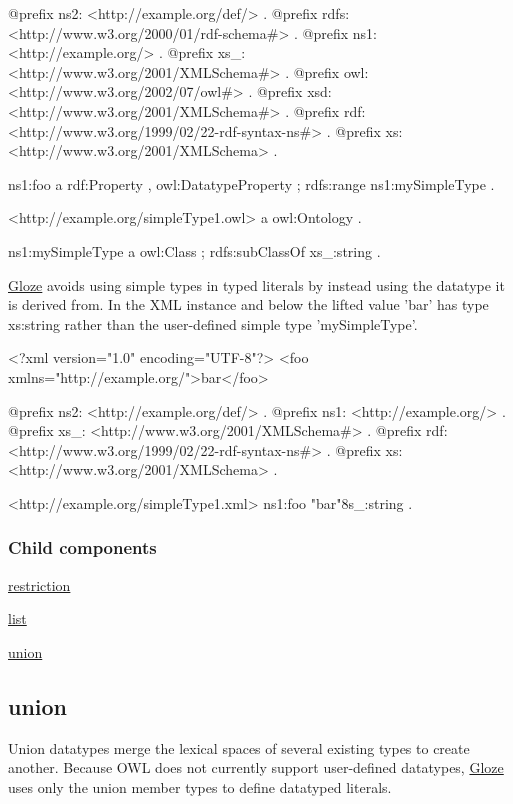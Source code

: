 \begin{DoxyCodeInclude}
@prefix ns2:     <http://example.org/def/> .
@prefix rdfs:    <http://www.w3.org/2000/01/rdf-schema#> .
@prefix ns1:     <http://example.org/> .
@prefix xs_:     <http://www.w3.org/2001/XMLSchema#> .
@prefix owl:     <http://www.w3.org/2002/07/owl#> .
@prefix xsd:     <http://www.w3.org/2001/XMLSchema#> .
@prefix rdf:     <http://www.w3.org/1999/02/22-rdf-syntax-ns#> .
@prefix xs:      <http://www.w3.org/2001/XMLSchema> .

ns1:foo
      a       rdf:Property , owl:DatatypeProperty ;
      rdfs:range ns1:mySimpleType .

<http://example.org/simpleType1.owl>
      a       owl:Ontology .

ns1:mySimpleType
      a       owl:Class ;
      rdfs:subClassOf xs_:string .
\end{DoxyCodeInclude}


\hyperlink{classcom_1_1hp_1_1gloze_1_1_gloze}{Gloze} avoids using simple types in typed literals by instead using the datatype it is derived from. In the XML instance and below the lifted value 'bar' has type xs:string rather than the user-\/defined simple type 'mySimpleType'.


\begin{DoxyCodeInclude}
<?xml version="1.0" encoding="UTF-8"?>
<foo xmlns="http://example.org/">bar</foo>
\end{DoxyCodeInclude}
 
\begin{DoxyCodeInclude}
@prefix ns2:     <http://example.org/def/> .
@prefix ns1:     <http://example.org/> .
@prefix xs_:     <http://www.w3.org/2001/XMLSchema#> .
@prefix rdf:     <http://www.w3.org/1999/02/22-rdf-syntax-ns#> .
@prefix xs:      <http://www.w3.org/2001/XMLSchema> .

<http://example.org/simpleType1.xml>
      ns1:foo "bar"^^xs_:string .
\end{DoxyCodeInclude}
\hypertarget{simpletype_simpleTypeChildren}{}\subsubsection{Child components}\label{simpletype_simpleTypeChildren}

\begin{DoxyItemize}
\item \hyperlink{restriction}{restriction}
\item \hyperlink{list}{list}
\item \hyperlink{union}{union} 
\end{DoxyItemize}\hypertarget{union}{}\subsection{union}\label{union}
Union datatypes merge the lexical spaces of several existing types to create another. Because OWL does not currently support user-\/defined datatypes, \hyperlink{classcom_1_1hp_1_1gloze_1_1_gloze}{Gloze} uses only the union member types to define datatyped literals.


